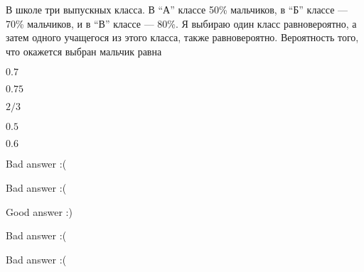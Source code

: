 
\begin{question}
В школе три выпускных класса. В ``А'' классе 50\% мальчиков, в ``Б''
классе — 70\% мальчиков, и в ``В'' классе — 80\%. Я выбираю один
класс равновероятно, а затем одного учащегося из этого класса, также
равновероятно. Вероятность того, что окажется выбран мальчик равна
\begin{answerlist}
  \item \(0.7\)
  \item \(0.75\)
  \item \(2/3\)
  \item \(0.5\)
  \item \(0.6\)
\end{answerlist}
\end{question}

\begin{solution}
\begin{answerlist}
  \item Bad answer :(
  \item Bad answer :(
  \item Good answer :)
  \item Bad answer :(
  \item Bad answer :(
\end{answerlist}
\end{solution}

